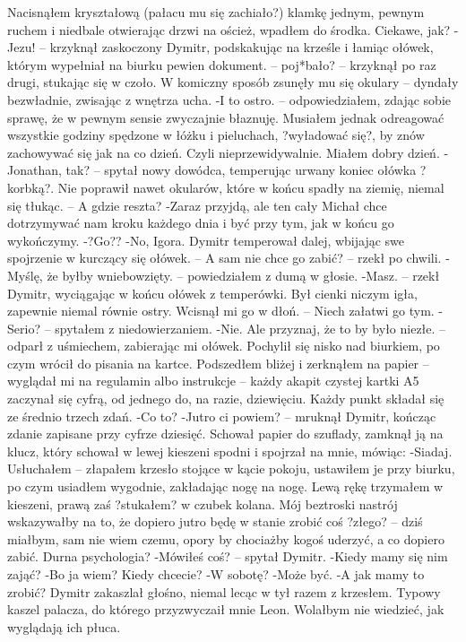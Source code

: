 \documentclass[../MAIN.tex]{subfiles}
\begin{document}
Nacisnąłem kryształową (pałacu mu się zachiało?) klamkę jednym, pewnym ruchem i niedbale otwierając drzwi na oścież, wpadłem do środka. Ciekawe, jak?
-Jezu! -- krzyknął zaskoczony Dymitr, podskakując na krześle i łamiąc ołówek, którym wypełniał na biurku pewien dokument. -- poj*bało? -- krzyknął po raz drugi, stukając się w czoło. W komiczny sposób zsunęły mu się okulary -- dyndały bezwładnie, zwisając z wnętrza ucha.
-I to ostro. -- odpowiedziałem, zdając sobie sprawę, że w pewnym sensie zwyczajnie błaznuję. Musiałem jednak odreagować wszystkie godziny spędzone w łóżku i pieluchach, ?wyładować się?, by znów zachowywać się jak na co dzień. Czyli nieprzewidywalnie.
Miałem dobry dzień.
-Jonathan, tak? -- spytał nowy dowódca, temperując urwany koniec ołówka ?korbką?. Nie poprawił nawet okularów, które w końcu spadły na ziemię, niemal się tłukąc. -- A gdzie reszta?
-Zaraz przyjdą, ale ten cały Michał chce dotrzymywać nam kroku każdego dnia i być przy tym, jak w końcu go wykończymy.
-?Go??
-No, Igora.
Dymitr temperował dalej, wbijając swe spojrzenie w kurczący się ołówek. -- A sam nie chce go zabić? -- rzekł po chwili.
-Myślę, że byłby wniebowzięty. -- powiedziałem z dumą w głosie.
-Masz. -- rzekł Dymitr, wyciągając w końcu ołówek z temperówki. Był cienki niczym igła, zapewnie niemal równie ostry. Wcisnął mi go w dłoń. -- Niech załatwi go tym.
-Serio? -- spytałem z niedowierzaniem.
-Nie. Ale przyznaj, że to by było niezłe. -- odparł z uśmiechem, zabierając mi ołówek. Pochylił się nisko nad biurkiem, po czym wrócił do pisania na kartce. Podszedłem bliżej i zerknąłem na papier -- wyglądał mi na regulamin albo instrukcje -- każdy akapit czystej kartki A5 zaczynał się cyfrą, od jednego do, na razie, dziewięciu. Każdy punkt składał się ze średnio trzech zdań.
-Co to?
-Jutro ci powiem? -- mruknął Dymitr, kończąc zdanie zapisane przy cyfrze dziesięć. Schował papier do szuflady, zamknął ją na klucz, który schował w lewej kieszeni spodni i spojrzał na mnie, mówiąc:
-Siadaj.
Usłuchałem -- złapałem krzesło stojące w kącie pokoju, ustawiłem je przy biurku, po czym usiadłem wygodnie, zakładając nogę na nogę. Lewą rękę trzymałem w kieszeni, prawą zaś ?stukałem? w czubek kolana. Mój beztroski nastrój wskazywałby na to, że dopiero jutro będę w stanie zrobić coś ?złego? -- dziś miałbym, sam nie wiem czemu, opory by chociażby kogoś uderzyć, a co dopiero zabić.
Durna psychologia?
-Mówiłeś coś? -- spytał Dymitr.
-Kiedy mamy się nim zająć?
-Bo ja wiem? Kiedy chcecie?
-W sobotę?
-Może być.
-A jak mamy to zrobić?
Dymitr zakaszlał głośno, niemal lecąc w tył razem z krzesłem. Typowy kaszel palacza, do którego przyzwyczaił mnie Leon. Wolałbym nie wiedzieć, jak wyglądają ich płuca.
\end{document}

